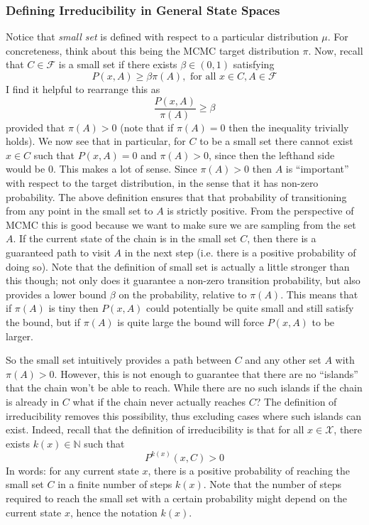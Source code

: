\documentclass[12pt]{article}
\begin{document}
\subsubsection{Defining Irreducibility in General State Spaces}
Notice that \textit{small set} is defined with respect to a particular distribution $\mu$. For concreteness, think about this being the MCMC target distribution $\pi$. Now, recall  that $C \in \mathcal{F}$ is a small set 
if there exists $\beta \in (0, 1)$ satisfying
\[P(x, A) \geq \beta \pi(A), \text{ for all } x \in C, A \in \mathcal{F}\]
I find it helpful to rearrange this as 
\[\frac{P(x, A)}{\pi(A)} \geq \beta\]
provided that $\pi(A) > 0$ (note that if $\pi(A) = 0$ then the inequality trivially holds). We now see that in particular, for $C$ to be a small set there cannot exist $x \in C$ such that 
$P(x, A) = 0$ and $\pi(A) > 0$, since then the lefthand side would be $0$. This makes a lot of sense. Since $\pi(A) > 0$ then $A$ is ``important'' with respect to the target distribution, in the sense that it has non-zero 
probability. The above definition ensures that that probability of transitioning from any point in the small set to $A$ is strictly positive. From the perspective of MCMC this is good because we want to make sure we 
are sampling from the set $A$. If the current state of the chain is in the small set $C$, then there is a guaranteed path to visit $A$ in the next step (i.e. there is a positive probability of doing so). Note that the definition 
of small set is actually a little stronger than this though; not only does it guarantee a non-zero transition probability, but also provides a lower bound $\beta$ on the probability, relative to $\pi(A)$. This means that if 
$\pi(A)$ is tiny then $P(x, A)$ could potentially be quite small and still satisfy the bound, but if $\pi(A)$ is quite large the bound will force $P(x, A)$ to be larger.

So the small set intuitively provides a path between $C$ and any other set $A$ with $\pi(A) > 0$. However, this is not enough to guarantee that there are no ``islands'' that the chain won't be able to reach. While there 
are no such islands if the chain is already in $C$ what if the chain never actually reaches $C$? The definition of irreducibility removes this possibility, thus excluding cases where such islands can exist. Indeed, recall 
that the definition of irreducibility is that for all $x \in \mathcal{X}$, there exists $k(x) \in \mathbb{N}$ such that 
\[P^{k(x)}(x, C) > 0\]
In words: for any current state $x$, there is a positive probability of reaching the small set $C$ in a finite number of steps $k(x)$. Note that the number of steps required to reach the small set with a certain probability might 
depend on the current state $x$, hence the notation $k(x)$.   
\end{document}
